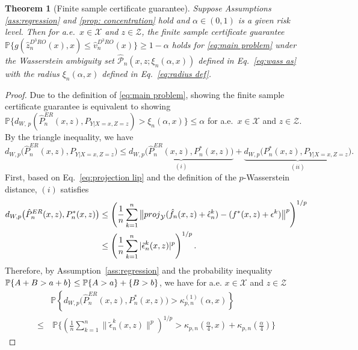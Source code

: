 \documentclass[10pt,a4paper]{amsart}
\newtheorem{theorem}{Theorem}
\begin{document}
\begin{theorem}[Finite sample certificate guarantee]\label{thm:fsg}
Suppose Assumptions  \ref{ass:regression} and \ref{prop: concentration} hold and $\alpha \in (0,1)$ is a given risk level. Then for a.e.\ $x \in \mathcal{X}$ and $z \in \mathcal{Z}$, the finite sample certificate guarantee $\mathbb{P}\big\{g(\hat{z}_n^{D^3RO}(x),x) \leq \hat{v}_n^{D^3RO}(x)\big\} \geq 1-\alpha$ holds for \eqref{eq:main problem} under the Wasserstein ambiguity set $\hat{\mathcal{P}}_n(x,z;\xi_n(\alpha,x))$ defined in Eq.~\eqref{eq:wass as} with the radius $\xi_n(\alpha,x)$ defined in Eq.~\eqref{eq:radius def}.
\end{theorem}

\begin{proof}
Due to the definition of \eqref{eq:main problem}, showing the finite sample certificate guarantee is equivalent to showing $\mathbb{P} \big\{d_{W,\, p} (\hat{P}_n^{ER}(x,z),P_{Y|X=x,Z=z}) > \xi_n(\alpha,x)\big\} \leq \alpha$ for a.e.\ $x \in \mathcal{X}$ and $z \in \mathcal{Z}$. By the triangle inequality, we have
\allowdisplaybreaks
\small
\begin{equation*}
d_{W,p}\bigl(\hat P_n^{ER}(x,z),P_{Y|X=x,Z=z}\bigr)
\le \underbrace{d_{W,p}\bigl(\hat P_n^{ER}(x,z),P_n^*(x,z)\bigr)}_{(i)}
+ \underbrace{d_{W,p}\bigl(P_n^*(x,z),P_{Y|X=x,Z=z}\bigr)}_{(ii)}.
\end{equation*}
\normalsize
First, based on Eq.\ \eqref{eq:projection lip} and the definition of the $p$-Wasserstein distance, $(i)$ satisfies
\small
\begin{align*}
d_{W,p}\bigl(\hat P_n^{ER}(x,z),P_n^*(x,z)\bigr)
&\le \left(\frac{1}{n} \sum_{k=1}^n \big\|{\rm{proj}}_\mathcal{Y} (\hat{f}_n(x,z)+\hat{\epsilon}_n^k)-(f^*(x,z)+\epsilon^k)\big\|^p\right)^{1/p} \\
& \le \left(\frac{1}{n}\sum_{k=1}^n |\tilde\epsilon_n^k(x,z)|^p\right)^{1/p}. 
\end{align*}
\normalsize
Therefore, by Assumption\ \ref{ass:regression} and the probability inequality 
$\mathbb P\{A+B >a+b\} \le \mathbb P\{A>a\} + \mathbb\{B >b\}$, we have for a.e. $x \in \mathcal X$ and $ z \in \mathcal Z$
\footnotesize
    \begin{align*}
        & \mathbb P \left\{
d_{W,p}\bigl(\hat P_n^{ER}(x,z),P_n^*(x,z)\bigr)
>
\kappa_{p,n}^{(1)}(\alpha,x)
\right\}
    \\
        \le &\ \mathbb{P}\bigg\{\left(\frac{1}{n} \sum_{k=1}^n \|\tilde{\epsilon}_n^k(x,z)\|^p\right)^{1/p} > \kappa_{p,n} (\frac{\alpha}{4},x) + \kappa_{p,n} (\frac{\alpha}{4})\bigg\} 

\end{align*}
\end{proof}
\end{document}
